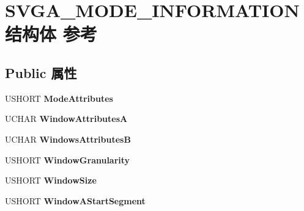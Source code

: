\hypertarget{struct_s_v_g_a___m_o_d_e___i_n_f_o_r_m_a_t_i_o_n}{}\section{S\+V\+G\+A\+\_\+\+M\+O\+D\+E\+\_\+\+I\+N\+F\+O\+R\+M\+A\+T\+I\+O\+N结构体 参考}
\label{struct_s_v_g_a___m_o_d_e___i_n_f_o_r_m_a_t_i_o_n}
\subsection*{Public 属性}
\begin{DoxyCompactItemize}
\item 
\mbox{\label{struct_s_v_g_a___m_o_d_e___i_n_f_o_r_m_a_t_i_o_n_afb6090ebdd8a40b70cbed8bda2558d5c}} 
U\+S\+H\+O\+RT {\bfseries Mode\+Attributes}
\item 
\mbox{\label{struct_s_v_g_a___m_o_d_e___i_n_f_o_r_m_a_t_i_o_n_a63419ea69e13de05ff7c66d2906a4939}} 
U\+C\+H\+AR {\bfseries Window\+AttributesA}
\item 
\mbox{\label{struct_s_v_g_a___m_o_d_e___i_n_f_o_r_m_a_t_i_o_n_a5861eaab213a05bee5bcf07b5a3a178c}} 
U\+C\+H\+AR {\bfseries Windows\+AttributesB}
\item 
\mbox{\label{struct_s_v_g_a___m_o_d_e___i_n_f_o_r_m_a_t_i_o_n_aa71501af047ce6343b83467a92f58273}} 
U\+S\+H\+O\+RT {\bfseries Window\+Granularity}
\item 
\mbox{\label{struct_s_v_g_a___m_o_d_e___i_n_f_o_r_m_a_t_i_o_n_a7f1ada41ba5261393cc94dba86f1f530}} 
U\+S\+H\+O\+RT {\bfseries Window\+Size}
\item 
\mbox{\label{struct_s_v_g_a___m_o_d_e___i_n_f_o_r_m_a_t_i_o_n_a42b937bcfeec5032551f031c3aeb2c48}} 
U\+S\+H\+O\+RT {\bfseries Window\+A\+Start\+Segment}
\item 
\mbox{\label{struct_s_v_g_a___m_o_d_e___i_n_f_o_r_m_a_t_i_o_n_ad78d9657f519982f93a25498fc6feea1}} 

\end{DoxyCompactItemize}
